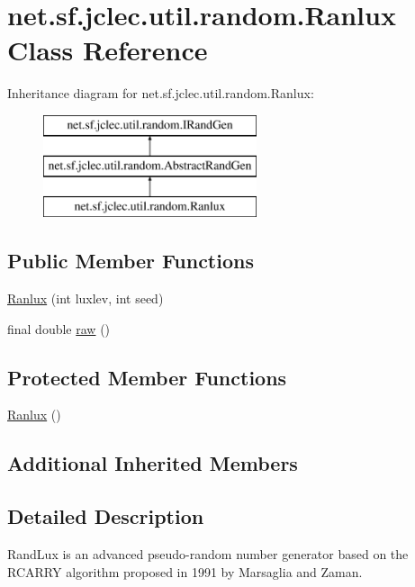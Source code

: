 \hypertarget{classnet_1_1sf_1_1jclec_1_1util_1_1random_1_1_ranlux}{\section{net.\-sf.\-jclec.\-util.\-random.\-Ranlux Class Reference}
\label{classnet_1_1sf_1_1jclec_1_1util_1_1random_1_1_ranlux}
}
Inheritance diagram for net.\-sf.\-jclec.\-util.\-random.\-Ranlux\-:\begin{figure}[H]
\begin{center}
\leavevmode
\includegraphics[height=3.000000cm]{classnet_1_1sf_1_1jclec_1_1util_1_1random_1_1_ranlux}
\end{center}
\end{figure}
\subsection*{Public Member Functions}
\begin{DoxyCompactItemize}
\item 
\hyperlink{classnet_1_1sf_1_1jclec_1_1util_1_1random_1_1_ranlux_a770a1b1cbbbaede3f6c3be720c88c284}{Ranlux} (int luxlev, int seed)
\item 
final double \hyperlink{classnet_1_1sf_1_1jclec_1_1util_1_1random_1_1_ranlux_a2a35b5c1a2a08b985c04b25ec7f8ef43}{raw} ()
\end{DoxyCompactItemize}
\subsection*{Protected Member Functions}
\begin{DoxyCompactItemize}
\item 
\hyperlink{classnet_1_1sf_1_1jclec_1_1util_1_1random_1_1_ranlux_ad4bc0fb1b59447d507ece8cc4383236e}{Ranlux} ()
\end{DoxyCompactItemize}
\subsection*{Additional Inherited Members}


\subsection{Detailed Description}
Rand\-Lux is an advanced pseudo-\/random number generator based on the R\-C\-A\-R\-R\-Y algorithm proposed in 1991 by Marsaglia and Zaman.

